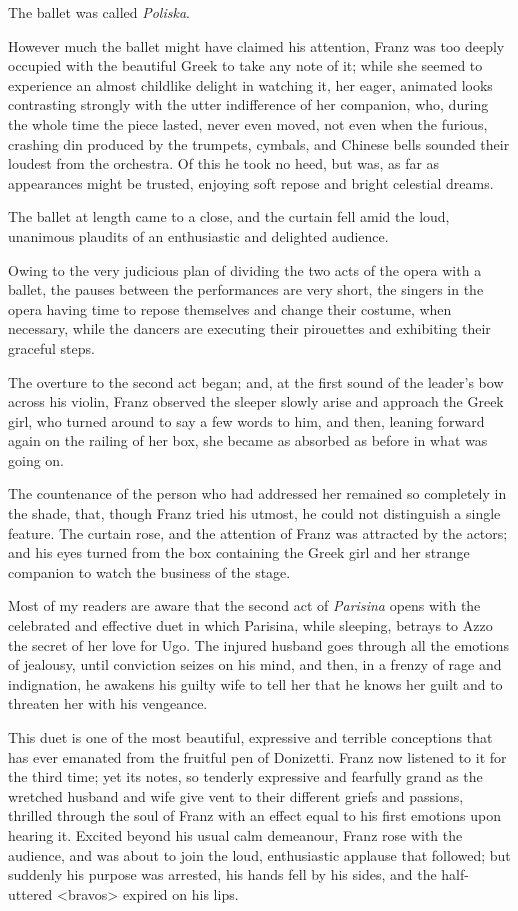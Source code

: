  The ballet was called \textit{Poliska}. 

 However much the ballet might have claimed his attention, Franz was too deeply occupied with the beautiful Greek to take any note of it; while she seemed to experience an almost childlike delight in watching it, her eager, animated looks contrasting strongly with the utter indifference of her companion, who, during the whole time the piece lasted, never even moved, not even when the furious, crashing din produced by the trumpets, cymbals, and Chinese bells sounded their loudest from the orchestra. Of this he took no heed, but was, as far as appearances might be trusted, enjoying soft repose and bright celestial dreams. 

 The ballet at length came to a close, and the curtain fell amid the loud, unanimous plaudits of an enthusiastic and delighted audience. 

 Owing to the very judicious plan of dividing the two acts of the opera with a ballet, the pauses between the performances are very short, the singers in the opera having time to repose themselves and change their costume, when necessary, while the dancers are executing their pirouettes and exhibiting their graceful steps. 

 The overture to the second act began; and, at the first sound of the leader's bow across his violin, Franz observed the sleeper slowly arise and approach the Greek girl, who turned around to say a few words to him, and then, leaning forward again on the railing of her box, she became as absorbed as before in what was going on. 

 The countenance of the person who had addressed her remained so completely in the shade, that, though Franz tried his utmost, he could not distinguish a single feature. The curtain rose, and the attention of Franz was attracted by the actors; and his eyes turned from the box containing the Greek girl and her strange companion to watch the business of the stage. 

 Most of my readers are aware that the second act of \textit{Parisina} opens with the celebrated and effective duet in which Parisina, while sleeping, betrays to Azzo the secret of her love for Ugo. The injured husband goes through all the emotions of jealousy, until conviction seizes on his mind, and then, in a frenzy of rage and indignation, he awakens his guilty wife to tell her that he knows her guilt and to threaten her with his vengeance. 

 This duet is one of the most beautiful, expressive and terrible conceptions that has ever emanated from the fruitful pen of Donizetti. Franz now listened to it for the third time; yet its notes, so tenderly expressive and fearfully grand as the wretched husband and wife give vent to their different griefs and passions, thrilled through the soul of Franz with an effect equal to his first emotions upon hearing it. Excited beyond his usual calm demeanour, Franz rose with the audience, and was about to join the loud, enthusiastic applause that followed; but suddenly his purpose was arrested, his hands fell by his sides, and the half-uttered <bravos> expired on his lips. 


